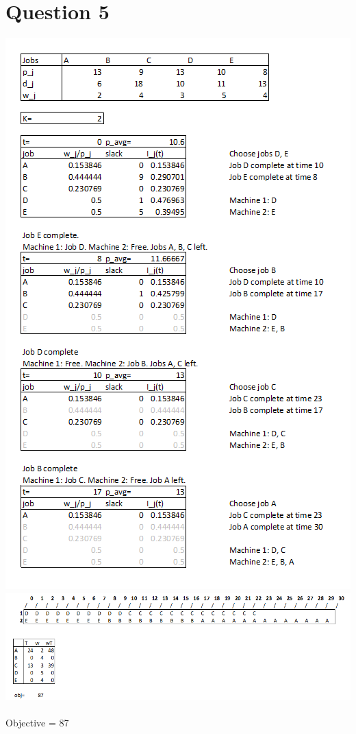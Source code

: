 \documentclass[10pt,a4paper]{article}
\begin{document}
\section*{Question 5}
\includegraphics[width=0.8\linewidth]{q5}\\
\newpage
\includegraphics[width=1\linewidth]{q5_2}\\ \\
Objective = 87
\end{document}
